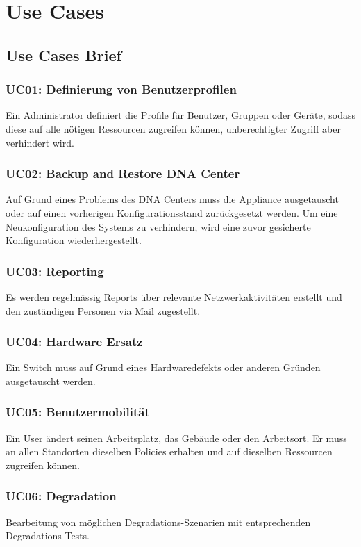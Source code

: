 \section{Use Cases} \label{usecases}

\subsection{Use Cases Brief}
\subsubsection{UC01: Definierung von Benutzerprofilen}
Ein Administrator definiert die Profile für Benutzer, Gruppen oder Geräte, sodass diese auf alle nötigen Ressourcen zugreifen können, unberechtigter Zugriff aber verhindert wird.

\subsubsection{UC02: Backup and Restore DNA Center}
Auf Grund eines Problems des DNA Centers muss die Appliance ausgetauscht oder auf einen vorherigen Konfigurationsstand zurückgesetzt werden. Um eine Neukonfiguration des Systems zu verhindern, wird eine zuvor gesicherte Konfiguration wiederhergestellt.

\subsubsection{UC03: Reporting}
Es werden regelmässig Reports über relevante Netzwerkaktivitäten erstellt und den zuständigen Personen via Mail zugestellt.

\subsubsection{UC04: Hardware Ersatz}
Ein Switch muss auf Grund eines Hardwaredefekts oder anderen Gründen ausgetauscht werden.

\subsubsection{UC05: Benutzermobilität}
Ein User ändert seinen Arbeitsplatz, das Gebäude oder den Arbeitsort. Er muss an allen Standorten dieselben Policies erhalten und auf dieselben Ressourcen zugreifen können.

\subsubsection{UC06: Degradation}
Bearbeitung von möglichen Degradations-Szenarien mit entsprechenden Degradations-Tests.

